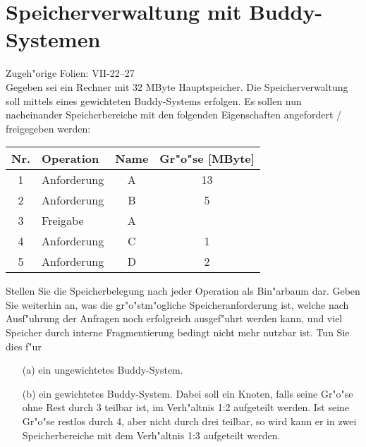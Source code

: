 \section{Speicherverwaltung mit Buddy-Systemen}

Zugeh"orige Folien:  VII-22--27 \\

Gegeben sei ein Rechner mit 32 MByte Hauptspeicher.  Die
Speicherverwaltung soll mittels eines gewichteten Buddy-Systems
erfolgen.  Es sollen nun nacheinander Speicherbereiche mit den
folgenden Eigenschaften angefordert / freigegeben werden:

\begin{center}
  \begin{tabular}{clcc}
    \toprule
    Nr. & Operation   & Name & Gr"o"se [MByte] \\
    \midrule
    1   & Anforderung & A    & 13 \\
    2   & Anforderung & B    & 5  \\
    3   & Freigabe    & A    &    \\
    4   & Anforderung & C    & 1  \\
    5   & Anforderung & D    & 2  \\
    \bottomrule
  \end{tabular}
\end{center}

Stellen Sie die Speicherbelegung nach jeder Operation als Bin"arbaum
dar.  Geben Sie weiterhin an, was die gr"o"stm"ogliche
Speicheranforderung ist, welche nach Ausf"uhrung der Anfragen noch
erfolgreich ausgef"uhrt werden kann, und viel Speicher durch interne
Fragmentierung bedingt nicht mehr nutzbar ist.  Tun Sie dies f"ur

\begin{enumerate}
\item[(a)] ein ungewichtetes Buddy-System.
  
\item[(b)] ein gewichtetes Buddy-System.  Dabei soll ein Knoten, falls
  seine Gr"o"se ohne Rest durch 3 teilbar ist, im Verh"altnis 1:2
  aufgeteilt werden.  Ist seine Gr"o"se restlos durch 4, aber nicht
  durch drei teilbar, so wird kann er in zwei Speicherbereiche mit dem
  Verh"altnis 1:3 aufgeteilt werden.
\end{enumerate}
